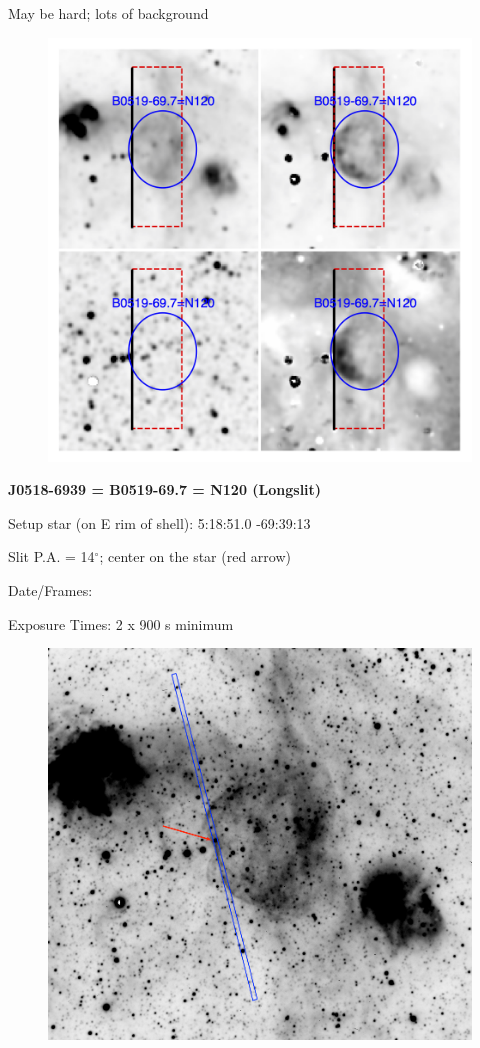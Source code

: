 \documentclass[11pt]{article}
\begin{document}
May be hard; lots of background
\begin{figure}
\includegraphics[width=12.5cm]{snapshots/N120_5arcmin.png}
\end{figure}

\newpage
{\bf J0518-6939 = B0519-69.7 = N120  (Longslit)}  
 
Setup star (on E rim of shell):   5:18:51.0  -69:39:13     

Slit P.A. = 14$^\circ$; center on the star (red arrow)

Date/Frames:  

Exposure Times:  2 x 900 s minimum

\begin{figure}
\includegraphics[width=12.5cm]{snapshots/N120_longslit.png}
\end{figure}
\end{document}

